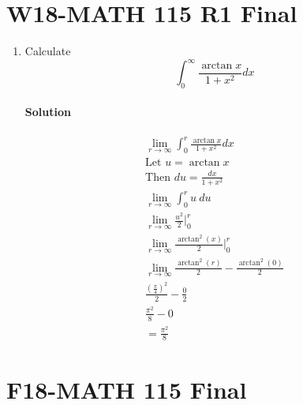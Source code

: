 \documentclass[MATH-115-Notes.tex]{subfiles}
\begin{document}
\section{W18-MATH 115 R1 Final}
\begin{enumerate}
    \item Calculate \[\int_{0}^{\infty}\frac{\arctan x}{1+x^2}dx\]
    \paragraph*{Solution}
    \begin{gather*}
        \lim_{r \to \infty} \int_{0}^{r}\frac{\arctan x}{1+x^2}dx\\
        \text{Let } u = \arctan x\\
        \text{Then } du = \frac{dx}{1 + x^2}\\
        \lim_{r \to \infty} \int_{0}^{r} u\ du\\
        \lim_{r \to \infty} \frac{u^2}{2}\Big|_0^r\\
        \lim_{r \to \infty} \frac{\arctan^2(x)}{2}\Big|_0^r\\
        \lim_{r \to \infty} \frac{\arctan^2(r)}{2} - \frac{\arctan^2(0)}{2}\\
        \frac{\left( \frac{\pi}{4} \right)^2}{2} - \frac{0}{2}\\
        \frac{\pi^2}{8} - 0\\
        = \frac{\pi^2}{8}
    \end{gather*}
    \newpage


\end{enumerate}
\newpage
\section{F18-MATH 115 Final}
\end{document}
